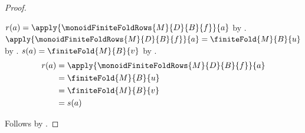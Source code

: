 \begin{proof}
\begin{subproof}
        $r(a)=\apply{\monoidFiniteFoldRows{M}{D}{B}{f}}{a}$ by
            .
        $\apply{\monoidFiniteFoldRows{M}{D}{B}{f}}{a}
            =\finiteFold{M}{B}{u}$ by
            .
        $s(a)=\finiteFold{M}{B}{v}$ by
            .
        \begin{align*}
            r(a)
                &= \apply{\monoidFiniteFoldRows{M}{D}{B}{f}}{a}
                \\
                &= \finiteFold{M}{B}{u}
                \\
                &= \finiteFold{M}{B}{v}
                \\
                &= s(a)
        \end{align*}
    \end{subproof}
    Follows by .
\end{proof}

